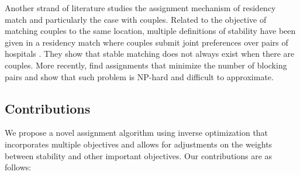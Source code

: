 \documentclass[11pt]{article}
\begin{document}
Another strand of literature studies the assignment mechanism of residency match and particularly the case with couples.
Related to the objective of matching couples to the same location, multiple definitions of stability have been given in a residency match where couples submit joint preferences over pairs of hospitals \citep{kojima2013, mcdermid2010}. They show that stable matching does not always exist when there are couples. 
More recently, \cite{manlove2017} find assignments that minimize the number of blocking pairs and show that such problem is NP-hard and difficult to approximate. 


\subsection{Contributions}
We propose a novel assignment algorithm using inverse optimization that incorporates multiple objectives and allows for adjustments on the weights between stability and other important objectives. Our contributions are as follows: 
\end{document}
